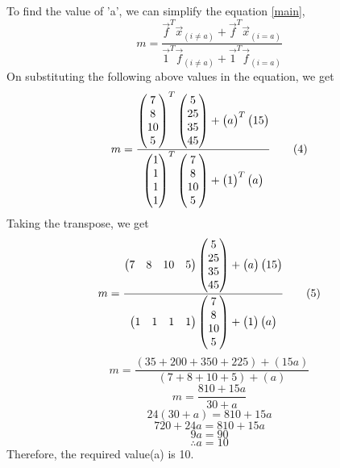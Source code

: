 \documentclass[journal,12pt,twocolumn]{IEEEtran}
\begin{document}
To find the value of 'a', we can simplify the equation \eqref{main},
\begin{equation}
		m = \frac{\vec{f}^T\vec{x}_{(i\neq a)} + \vec{f}^T\vec{x}_{(i=a)}}{\vec{1}^T\vec{f}_{(i\neq a)} + \vec{1}^T\vec{f}_{(i=a)}}\tag{3}
\end{equation}
On substituting the following above values in the equation, we get
\begin{equation}
	m = \frac{\begin{pmatrix}7\\8\\10\\5\end{pmatrix}^T\begin{pmatrix}5\\25\\35\\45\end{pmatrix} + \begin{pmatrix}a\end{pmatrix}^T\begin{pmatrix}15\end{pmatrix}}{\begin{pmatrix}1\\1\\1\\1\end{pmatrix}^T\begin{pmatrix}7\\8\\10\\5\end{pmatrix} + \begin{pmatrix}1\end{pmatrix}^T\begin{pmatrix}a\end{pmatrix}}\tag{4}
\end{equation}
Taking the transpose, we get
\begin{equation}
	m = \frac{\begin{pmatrix}7&8&10&5\end{pmatrix}\begin{pmatrix}5\\25\\35\\45\end{pmatrix} + \begin{pmatrix}a\end{pmatrix}\begin{pmatrix}15\end{pmatrix}}{\begin{pmatrix}1&1&1&1\end{pmatrix}\begin{pmatrix}7\\8\\10\\5\end{pmatrix} + \begin{pmatrix}1\end{pmatrix}\begin{pmatrix}a\end{pmatrix}}\tag{5}
\end{equation}
\begin{equation}
	m = \frac{(35 + 200 + 350 + 225) + (15a)}{(7 + 8 + 10 + 5) + (a)} \tag{6}
\end{equation}
\begin{equation}
	m = \frac{810 + 15a}{30 + a} \tag{7}
\end{equation}
	\begin{equation}
		24(30 + a) = 810 + 15a \tag{8}
	\end{equation}
	\begin{equation}
		720 + 24a = 810 + 15a \tag{9}
	\end{equation}
	\begin{equation}
		9a = 90 \tag{10}
	\end{equation}
	\begin{equation}
		\therefore a = 10 \tag{11}
	\end{equation}
	Therefore, the required value(a) is 10.
\end{document}
